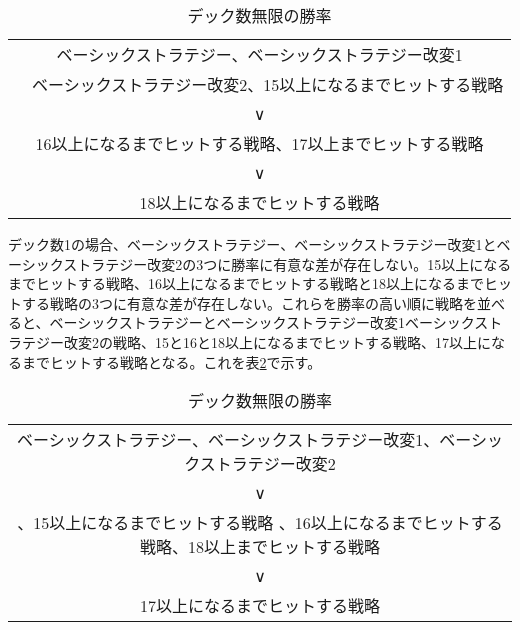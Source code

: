 \begin{table}[H]
 \caption{デック数無限の勝率\label{rate1}}
 \begin{center}
  \begin{tabular}{c}
   ベーシックストラテジー、ベーシックストラテジー改変1\\
　ベーシックストラテジー改変2、15以上になるまでヒットする戦略 \\ 
    ∨ \\
   16以上になるまでヒットする戦略、17以上までヒットする戦略  \\
   ∨ \\
   18以上になるまでヒットする戦略 \\
   
  \end{tabular}
 \end{center}
\end{table}

デック数1の場合、ベーシックストラテジー、ベーシックストラテジー改変1とベーシックストラテジー改変2の3つに勝率に有意な差が存在しない。15以上になるまでヒットする戦略、16以上になるまでヒットする戦略と18以上になるまでヒットする戦略の3つに有意な差が存在しない。これらを勝率の高い順に戦略を並べると、ベーシックストラテジーとベーシックストラテジー改変1ベーシックストラテジー改変2の戦略、15と16と18以上になるまでヒットする戦略、17以上になるまでヒットする戦略となる。これを表\ref{rate2}で示す。

\begin{table}[H]
 \caption{デック数無限の勝率\label{rate2}}
 \begin{center}
  \begin{tabular}{c}
   ベーシックストラテジー、ベーシックストラテジー改変1、ベーシックストラテジー改変2\\ 
    ∨ \\
   、15以上になるまでヒットする戦略 、16以上になるまでヒットする戦略、18以上までヒットする戦略  \\
   ∨ \\
   17以上になるまでヒットする戦略 \\
  \end{tabular}
 \end{center}
\end{table}

